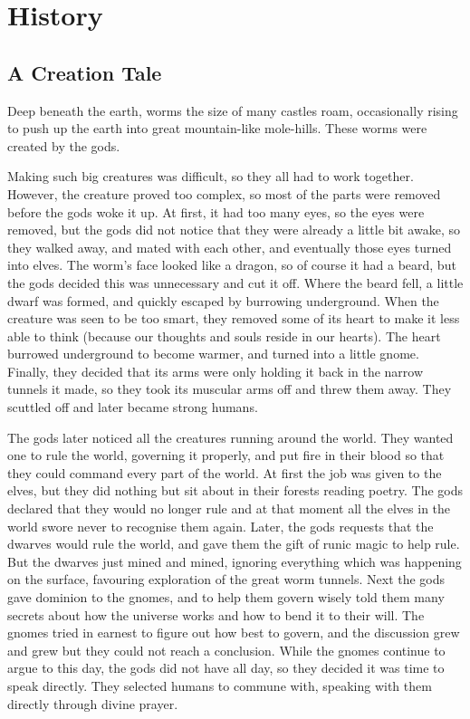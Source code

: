 \chapter{History}

\section{A Creation Tale}

\begin{multicols}{2}

\begin{exampletext}

\noindent Deep beneath the earth, worms the size of many castles roam, occasionally rising to push up the earth into great mountain-like mole-hills.
These worms were created by the gods.

Making such big creatures was difficult, so they all had to work together.
However, the creature proved too complex, so most of the parts were removed before the gods woke it up.
At first, it had too many eyes, so the eyes were removed, but the gods did not notice that they were already a little bit awake, so they walked away, and mated with each other, and eventually those eyes turned into elves.
The worm's face looked like a dragon, so of course it had a beard, but the gods decided this was unnecessary and cut it off.
Where the beard fell, a little dwarf was formed, and quickly escaped by burrowing underground.
When the creature was seen to be too smart, they removed some of its heart to make it less able to think (because our thoughts and souls reside in our hearts).
The heart burrowed underground to become warmer, and turned into a little gnome.
Finally, they decided that its arms were only holding it back in the narrow tunnels it made, so they took its muscular arms off and threw them away.
They scuttled off and later became strong humans.

The gods later noticed all the creatures running around the world.
They wanted one to rule the world, governing it properly, and put fire in their blood so that they could command every part of the world.
At first the job was given to the elves, but they did nothing but sit about in their forests reading poetry.
The gods declared that they would no longer rule and at that moment all the elves in the world swore never to recognise them again.
Later, the gods requests that the dwarves would rule the world, and gave them the gift of runic magic to help rule.
But the dwarves just mined and mined, ignoring everything which was happening on the surface, favouring exploration of the great worm tunnels.
Next the gods gave dominion to the gnomes, and to help them govern wisely told them many secrets about how the universe works and how to bend it to their will.
The gnomes tried in earnest to figure out how best to govern, and the discussion grew and grew but they could not reach a conclusion.
While the gnomes continue to argue to this day, the gods did not have all day, so they decided it was time to speak directly.
They selected humans to commune with, speaking with them directly through divine prayer.


\end{exampletext}
\end{multicols}

